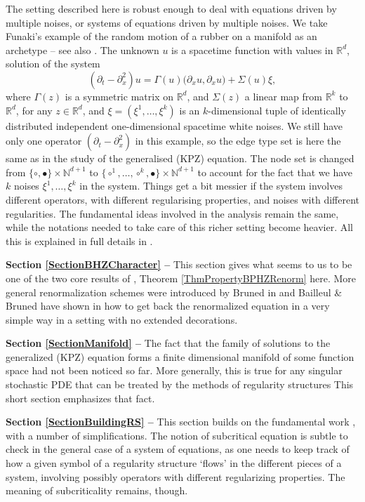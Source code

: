 \documentclass[10pt, reqno]{amsart}
\numberwithin{subsection}{section}
\numberwithin{subsubsection}{subsection}
\numberwithin{equation}{section} %
\theoremstyle{mystyle}
\theoremstyle{mystyle2}
\theoremstyle{mystyle3}
\newcommand\bbN{\mathbb{N}}
\newcommand\bbR{\mathbb{R}}
\begin{document}
The setting described here is robust enough to deal with equations driven by multiple noises, or systems of equations driven by multiple noises. We 
take Funaki's example \cite{Funaki} of the random motion of a rubber on a manifold as an archetype -- see also \cite{HairerString, BrunedGabrielHairerZambotti}. The unknown $u$ is a spacetime function with values in $\bbR^d$, solution of the system
$$
(\partial_t-\partial_x^2) u = \Gamma(u)\big(\partial_xu,\partial_xu\big) + \Sigma(u)\xi,
$$
where $\Gamma(z)$ is a symmetric matrix on $\bbR^d$, and $\Sigma(z)$ a linear map from $\bbR^k$ to $\bbR^d$, for any $z\in\bbR^d$, and $\xi = (\xi^1,\dots, \xi^k)$ is an $k$-dimensional tuple of identically distributed independent one-dimensional spacetime white noises. We still have only one operator $(\partial_t-\partial_x^2)$ in this example, so the edge type set is here the same as in the study of the generalised (KPZ) equation. 
The node set is changed from $\{\circ,\bullet\}\times\bbN^{d+1}$ to $\{\circ^1,\dots, \circ^k, \bullet\}\times\bbN^{d+1}$ to account for the fact that we have $k$ noises $\xi^1,\dots, \xi^k$ in the system. Things get a bit messier if the system involves different operators, with different regularising properties, and noises with different regularities. The fundamental ideas involved in the analysis remain the same, while the notations 
needed to take care of this richer setting become heavier. All this is explained in full details in \cite{BHZ}. 

\medskip

\textbf{\textsf{Section \ref{SectionBHZCharacter} -- }} This section gives what seems to us to be one of the two core results of \cite{BHZ}, Theorem \ref{ThmPropertyBPHZRenorm} here. More general renormalization schemes were introduced by Bruned in \cite{BrunedRecursive} and Bailleul \& Bruned have shown in \cite{BailleulBruned} how to get back the renormalized equation in a very simple way in a setting with no extended decorations.

\medskip

\textbf{\textsf{Section \ref{SectionManifold} -- }} The fact that the family of solutions to the generalized (KPZ) equation forms a finite dimensional manifold of some function space had not been noticed so far. More generally, this is true for any singular stochastic PDE that can be treated by the methods of regularity structures This short section emphasizes that fact.

\medskip

\textbf{\textsf{Section \ref{SectionBuildingRS} -- }} This section builds 
on the fundamental work \cite{BHZ}, with a number of simplifications. The 
notion of subcritical equation is subtle to check in the general case of a system of equations, as one needs to keep track of how a given symbol of a regularity structure `flows' in the different pieces of a system, involving possibly operators with different regularizing properties. The meaning of subcriticality remains, though.   
\end{document}
